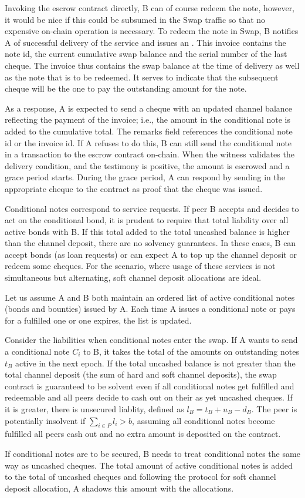 Invoking the escrow contract directly, B can of course redeem the note, however, it would be nice if this could be subsumed in the Swap traffic so that no expensive on-chain operation is necessary. 
To redeem the note in Swap, B notifies A of successful delivery of the service and issues an . This invoice contains the note id, the current cumulative swap balance and the serial number of the last cheque. The invoice thus contains the swap balance at the time of delivery as well as the note that is to be redeemed. It serves to indicate that the subsequent cheque will be the one to pay the outstanding amount for the note.

As a response, A is expected to send a cheque with an updated channel balance reflecting the payment of the invoice; i.e., the amount in the conditional note is added to the cumulative total. The remarks field references the conditional note id or the invoice id. If A refuses to do this, B can still send the conditional note in a transaction to the escrow contract on-chain. When the witness validates the delivery condition, and the testimony is positive, the amount is escrowed and a grace period starts. During the grace period, A can respond by sending in the appropriate cheque to the contract as proof that the cheque was issued.

Conditional notes correspond to service requests. If peer B accepts and decides to act on the conditional bond, it is prudent to require that total liability over all active bonds with B. If this total added to the total uncashed balance is higher than the channel deposit, there are no solvency guarantees. In these cases, B can accept bonds (as loan requests) or can expect A to top up the channel deposit or redeem some cheques. For the scenario, where usage of these services is not simultaneous but alternating, soft channel deposit allocations 
are ideal.

Let us assume A and B both maintain an ordered list of active conditional notes (bonds and bounties) issued by A.
Each time A issues a conditional note or pays for a fulfilled one or one expires, the list is updated.

Consider the liabilities when conditional notes enter the swap. 
If A wants to send a conditional note $C_i$ to B, it takes the total of the amounts on outstanding notes $t_B$ active in the next epoch. 
If the total uncashed balance is not greater than the total channel deposit (the sum of hard and soft channel deposits), the swap contract is guaranteed to be solvent even if all conditional notes get fulfilled and redeemable and all peers decide to cash out on their as yet uncashed cheques. If it is greater, there is unsecured liablity, defined as $l_B = t_B + u_B - d_B$. The peer is potentially insolvent if $\sum_{i\in P}l_i > b$, assuming all conditional notes become fulfilled all peers cash out and no extra amount is deposited on the contract. 

If conditional notes are to be secured, B needs to treat conditional notes the same way as uncashed cheques.
The total amount of active conditional notes is added to the total of uncashed cheques and following the protocol for soft channel deposit allocation, A shadows this amount with the allocations.
                            